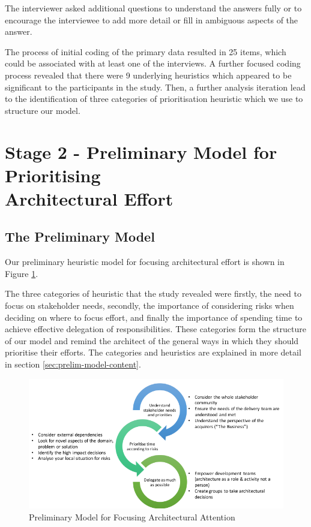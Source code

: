 The interviewer asked additional questions to understand the answers fully or to encourage the interviewee to add more detail or fill in ambiguous aspects of the answer.

The process of initial coding of the primary data resulted in 25 items, which could be associated with at least one of the interviews.  A further focused coding process revealed that there were 9 underlying heuristics which appeared to be significant to the participants in the study. Then, a further analysis iteration lead to the identification of three categories of prioritisation heuristic which we use to structure our model.

\section{Stage 2 - Preliminary Model for Prioritising \\Architectural Effort}
\subsection{The Preliminary Model}

Our preliminary heuristic model for focusing architectural effort is shown in Figure \ref{figure:prelmodel}.
 
The three categories of heuristic that the study revealed were firstly, the need to focus on stakeholder needs, secondly, the importance of considering risks when deciding on where to focus effort, and finally the importance of spending time to achieve effective delegation of responsibilities.  These categories form the structure of our model and remind the architect of the general ways in which they should prioritise their efforts. The categories and heuristics are explained in more detail in section \ref{sec:prelim-model-content}.

\begin{figure}
\centering
\includegraphics[width=\textwidth]{Figures/prioritisation-prelim-model}
\caption{Preliminary Model for Focusing Architectural Attention}
\label{figure:prelmodel}
\end{figure}  

